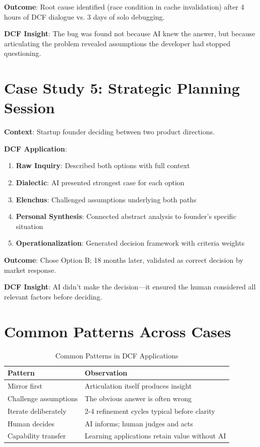 \textbf{Outcome}: Root cause identified (race condition in cache invalidation) after 4 hours of DCF dialogue vs. 3 days of solo debugging.

\textbf{DCF Insight}: The bug was found not because AI knew the answer, but because articulating the problem revealed assumptions the developer had stopped questioning.

\section{Case Study 5: Strategic Planning Session}

\textbf{Context}: Startup founder deciding between two product directions.

\textbf{DCF Application}:
\begin{enumerate}
    \item \textbf{Raw Inquiry}: Described both options with full context
    \item \textbf{Dialectic}: AI presented strongest case for each option
    \item \textbf{Elenchus}: Challenged assumptions underlying both paths
    \item \textbf{Personal Synthesis}: Connected abstract analysis to founder's specific situation
    \item \textbf{Operationalization}: Generated decision framework with criteria weights
\end{enumerate}

\textbf{Outcome}: Chose Option B; 18 months later, validated as correct decision by market response.

\textbf{DCF Insight}: AI didn't make the decision---it ensured the human considered all relevant factors before deciding.

\section{Common Patterns Across Cases}

\begin{table}[H]
\centering
\begin{tabular}{ll}
\toprule
\textbf{Pattern} & \textbf{Observation} \\
\midrule
Mirror first & Articulation itself produces insight \\
Challenge assumptions & The obvious answer is often wrong \\
Iterate deliberately & 2-4 refinement cycles typical before clarity \\
Human decides & AI informs; human judges and acts \\
Capability transfer & Learning applications retain value without AI \\
\bottomrule
\end{tabular}
\caption{Common Patterns in DCF Applications}
\end{table}


